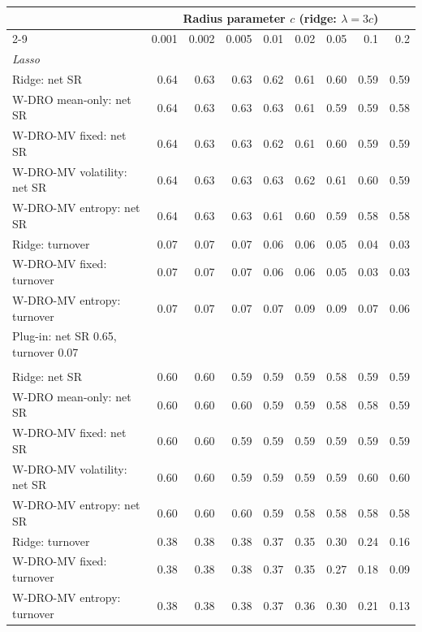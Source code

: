 \begin{tabular}{lrrrrrrrr}
\toprule
 & \multicolumn{8}{c}{Radius parameter $c$ (ridge: $\lambda = 3c$)} \\
\cmidrule(lr){2-9}
 & 0.001 & 0.002 & 0.005 & 0.01 & 0.02 & 0.05 & 0.1 & 0.2 \\
\midrule
\multicolumn{9}{l}{\textit{Lasso}} \\
\quad Ridge: net SR & 0.64 & 0.63 & 0.63 & 0.62 & 0.61 & 0.60 & 0.59 & 0.59 \\
\quad W-DRO mean-only: net SR & 0.64 & 0.63 & 0.63 & 0.63 & 0.61 & 0.59 & 0.59 & 0.58 \\
\quad W-DRO-MV fixed: net SR & 0.64 & 0.63 & 0.63 & 0.62 & 0.61 & 0.60 & 0.59 & 0.59 \\
\quad W-DRO-MV volatility: net SR & 0.64 & 0.63 & 0.63 & 0.63 & 0.62 & 0.61 & 0.60 & 0.59 \\
\quad W-DRO-MV entropy: net SR & 0.64 & 0.63 & 0.63 & 0.61 & 0.60 & 0.59 & 0.58 & 0.58 \\
\quad Ridge: turnover & 0.07 & 0.07 & 0.07 & 0.06 & 0.06 & 0.05 & 0.04 & 0.03 \\
\quad W-DRO-MV fixed: turnover & 0.07 & 0.07 & 0.07 & 0.06 & 0.06 & 0.05 & 0.03 & 0.03 \\
\quad W-DRO-MV entropy: turnover & 0.07 & 0.07 & 0.07 & 0.07 & 0.09 & 0.09 & 0.07 & 0.06 \\
\quad Plug-in: net SR 0.65, turnover 0.07 & \multicolumn{8}{l}{} \\
\addlinespace
\multicolumn{9}{l}{\textit{Random Forest}} \\
\quad Ridge: net SR & 0.60 & 0.60 & 0.59 & 0.59 & 0.59 & 0.58 & 0.59 & 0.59 \\
\quad W-DRO mean-only: net SR & 0.60 & 0.60 & 0.60 & 0.59 & 0.59 & 0.58 & 0.58 & 0.59 \\
\quad W-DRO-MV fixed: net SR & 0.60 & 0.60 & 0.59 & 0.59 & 0.59 & 0.59 & 0.59 & 0.59 \\
\quad W-DRO-MV volatility: net SR & 0.60 & 0.60 & 0.59 & 0.59 & 0.59 & 0.59 & 0.60 & 0.60 \\
\quad W-DRO-MV entropy: net SR & 0.60 & 0.60 & 0.60 & 0.59 & 0.58 & 0.58 & 0.58 & 0.58 \\
\quad Ridge: turnover & 0.38 & 0.38 & 0.38 & 0.37 & 0.35 & 0.30 & 0.24 & 0.16 \\
\quad W-DRO-MV fixed: turnover & 0.38 & 0.38 & 0.38 & 0.37 & 0.35 & 0.27 & 0.18 & 0.09 \\
\quad W-DRO-MV entropy: turnover & 0.38 & 0.38 & 0.38 & 0.37 & 0.36 & 0.30 & 0.21 & 0.13 \\

\end{tabular}
